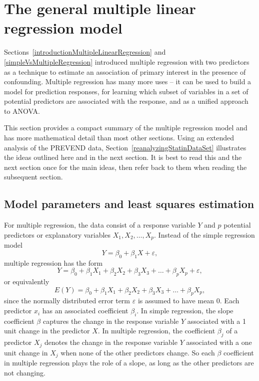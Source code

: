  \section{The general multiple linear regression model}
 \label{generalMultipleRegression}
 
Sections~\ref{introductionMultipleLinearRegression} and \ref{simpleVsMultipleRegression} introduced multiple regression with two predictors as a technique to estimate an association of primary interest in the presence of confounding.  Multiple regression has many more uses -- it can be used to build a model for prediction responses, for learning which subset of variables in a set of potential predictors are associated with the response, and as a unified approach to ANOVA.

This section provides a compact summary of the multiple regression model and has more mathematical detail than most other sections.  Using an extended analysis of the PREVEND data, Section~\ref{reanalyzingStatinDataSet} illustrates the ideas outlined here and in the next section.  It is best to read this and the next section once for the main ideas, then refer back to them when reading the subsequent section.
 
 
\subsection{Model parameters and least squares estimation}
 
For multiple regression, the data consist of a response variable $Y$ and $p$ potential predictors or explanatory variables $X_1, X_2,\ldots, X_p$.   Instead of the simple regression model 
 $${Y} = \beta_{0} + \beta_{1}X + {\varepsilon},$$
 multiple regression has the form
 $${Y} = \beta_{0} +
     \beta_{1}X_{1} + \beta_{2}X_{2} + \beta_{3}X_{3} + \dots +
     \beta_{p}X_{p} + \varepsilon,$$
or equivalently
 $$E(Y) = \beta_{0} + 
     \beta_{1}X_{1} + \beta_{2}X_{2} + \beta_{3}X_{3} + \dots +
     \beta_{p}X_{p},
	 \label{multipleRegressionModel}
	 $$ 
since the normally distributed error term $\varepsilon$ is assumed to have mean 0. Each predictor $x_i$ has an associated coefficient $\beta_i$.  In simple regression, the slope coefficient $\beta$ captures the change in the response variable $Y$ associated with a 1 unit  change in the predictor $X$.  In multiple regression, the coefficient $\beta_j$ of a predictor $X_j$ denotes the change in the response variable $Y$ associated with a one unit change in $X_j$ when none of the other predictors change.  So each $\beta$ coefficient in multiple regression plays the role of a slope, as long as the other predictors are not changing.

